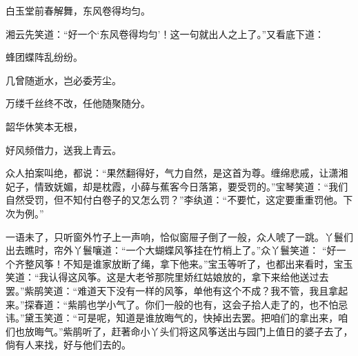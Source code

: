 \begin{poem}
    \begin{pl}白玉堂前春解舞，东风卷得均匀。\end{pl}
\end{poem}


\begin{parag}
    湘云先笑道：“好一个‘东风卷得均匀’！这一句就出人之上了。”又看底下道：
\end{parag}


\begin{poem}
    \begin{pl}蜂团蝶阵乱纷纷。\end{pl}

    \begin{pl}几曾随逝水，岂必委芳尘。\end{pl}

    \begin{pl}万缕千丝终不改，任他随聚随分。\end{pl}

    \begin{pl}韶华休笑本无根，\end{pl}

    \begin{pl}好风频借力，送我上青云。\end{pl}


\end{poem}


\begin{parag}
    众人拍案叫绝，都说：“果然翻得好，气力自然，是这首为尊。缠绵悲戚，让潇湘妃子，情致妩媚，却是枕霞，小薛与蕉客今日落第，要受罚的。”宝琴笑道：“我们自然受罚，但不知付白卷子的又怎么罚？”李纨道：“不要忙，这定要重重罚他。下次为例。”
\end{parag}


\begin{parag}
    一语未了，只听窗外竹子上一声响，恰似窗屉子倒了一般，众人唬了一跳。丫鬟们出去瞧时，帘外丫鬟嚷道：“一个大蝴蝶风筝挂在竹梢上了。”众丫鬟笑道： “好一个齐整风筝！不知是谁家放断了绳，拿下他来。”宝玉等听了，也都出来看时，宝玉笑道：“我认得这风筝。这是大老爷那院里娇红姑娘放的，拿下来给他送过去罢。”紫鹃笑道：“难道天下没有一样的风筝，单他有这个不成？我不管，我且拿起来。”探春道：“紫鹃也学小气了。你们一般的也有，这会子拾人走了的，也不怕忌讳。”黛玉笑道：“可是呢，知道是谁放晦气的，快掉出去罢。把咱们的拿出来，咱们也放晦气。”紫鹃听了，赶著命小丫头们将这风筝送出与园门上值日的婆子去了，倘有人来找，好与他们去的。
\end{parag}



